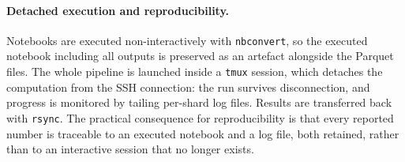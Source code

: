 \paragraph{Detached execution and reproducibility.} Notebooks are executed non-interactively
with \texttt{nbconvert}, so the executed notebook including all outputs is preserved as an
artefact alongside the Parquet files. The whole pipeline is launched inside a \texttt{tmux}
session, which detaches the computation from the SSH connection: the run survives disconnection,
and progress is monitored by tailing per-shard log files. Results are transferred back with
\texttt{rsync}. The practical consequence for reproducibility is that every reported number is
traceable to an executed notebook and a log file, both retained, rather than to an interactive
session that no longer exists.

